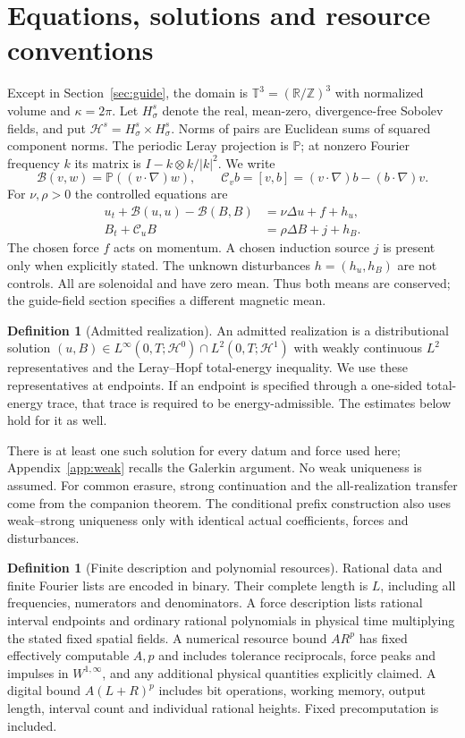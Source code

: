 \documentclass[11pt,a4paper]{amsart}
\theoremstyle{definition}
\newtheorem{definition}[theorem]{Definition}
\theoremstyle{remark}
\numberwithin{equation}{section}
\newcommand{\T}{\mathbb T}
\newcommand{\R}{\mathbb R}
\newcommand{\Z}{\mathbb Z}
\newcommand{\PP}{\mathbb P}
\newcommand{\Bcal}{\mathcal B}
\newcommand{\Ccal}{\mathcal C}
\newcommand{\Hcal}{\mathcal H}
\begin{document}
\section{Equations, solutions and resource conventions}\label{sec:setting}

Except in Section~\ref{sec:guide}, the domain is $\T^3=(\R/\Z)^3$ with normalized volume and $\kappa=2\pi$. Let $H^s_\sigma$ denote the real, mean-zero, divergence-free Sobolev fields, and put $\Hcal^s=H^s_\sigma\times H^s_\sigma$. Norms of pairs are Euclidean sums of squared component norms. The periodic Leray projection is $\PP$; at nonzero Fourier frequency $k$ its matrix is $I-k\otimes k/|k|^2$. We write
\[
 \Bcal(v,w)=\PP((v\cdot\nabla)w),\qquad
 \Ccal_v b=[v,b]=(v\cdot\nabla)b-(b\cdot\nabla)v.
\]
For $\nu,\rho>0$ the controlled equations are
\begin{align}
 u_t+\Bcal(u,u)-\Bcal(B,B)&=\nu\Delta u+f+h_u,\label{eq:mom}\\
 B_t+\Ccal_uB&=\rho\Delta B+j+h_B.\label{eq:ind}
\end{align}
The chosen force $f$ acts on momentum. A chosen induction source $j$ is present only when explicitly stated. The unknown disturbances $h=(h_u,h_B)$ are not controls. All are solenoidal and have zero mean. Thus both means are conserved; the guide-field section specifies a different magnetic mean.

\begin{definition}[Admitted realization]\label{def:LH}
An admitted realization is a distributional solution $(u,B)\in L^\infty(0,T;\Hcal^0)\cap L^2(0,T;\Hcal^1)$ with weakly continuous $L^2$ representatives and the Leray--Hopf total-energy inequality. We use these representatives at endpoints. If an endpoint is specified through a one-sided total-energy trace, that trace is required to be energy-admissible. The estimates below hold for it as well.
\end{definition}

There is at least one such solution for every datum and force used here; Appendix~\ref{app:weak} recalls the Galerkin argument. No weak uniqueness is assumed. For common erasure, strong continuation and the all-realization transfer come from the companion theorem. The conditional prefix construction also uses weak--strong uniqueness only with identical actual coefficients, forces and disturbances.

\begin{definition}[Finite description and polynomial resources]\label{def:resources}
Rational data and finite Fourier lists are encoded in binary. Their complete length is $L$, including all frequencies, numerators and denominators. A force description lists rational interval endpoints and ordinary rational polynomials in physical time multiplying the stated fixed spatial fields. A numerical resource bound $AR^p$ has fixed effectively computable $A,p$ and includes tolerance reciprocals, force peaks and impulses in $W^{1,\infty}$, and any additional physical quantities explicitly claimed. A digital bound $A(L+R)^p$ includes bit operations, working memory, output length, interval count and individual rational heights. Fixed precomputation is included.
\end{definition}
\end{document}
